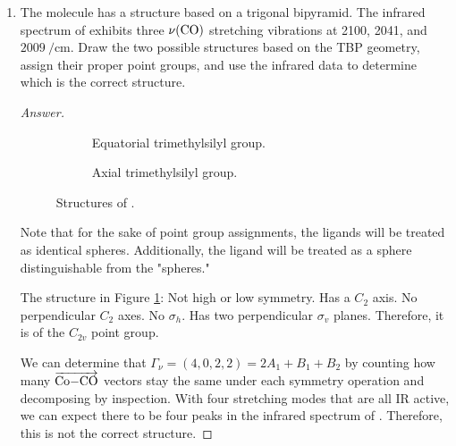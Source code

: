\documentclass[../psets.tex]{subfiles}
\begin{document}
\begin{enumerate}[label={\Roman*)}]
\begin{proof}[Answer]
\begin{align*}
        \end{align*}
    \end{proof}
    \newpage
    \item The molecule  has a structure based on a trigonal bipyramid. The infrared spectrum of  exhibits three $\nu(\ce{CO})$ stretching vibrations at 2100, 2041, and $\SI{2009}{\per\centi\meter}$. Draw the two possible structures based on the TBP geometry, assign their proper point groups, and use the infrared data to determine which is the correct structure.
    \begin{proof}[Answer]
        \begin{figure}[h!]
            \centering
            \begin{subfigure}[b]{0.35\linewidth}
                \centering
                \footnotesize
                \caption{Equatorial trimethylsilyl group.}
                \label{fig:structure-CoCO4SiMe3a}
            \end{subfigure}
            \begin{subfigure}[b]{0.35\linewidth}
                \centering
                \footnotesize
                \caption{Axial trimethylsilyl group.}
                \label{fig:structure-CoCO4SiMe3b}
            \end{subfigure}
            \caption{Structures of .}
            \label{fig:structure-CoCO4SiMe3}
        \end{figure}
        Note that for the sake of point group assignments, the  ligands will be treated as identical spheres. Additionally, the  ligand will be treated as a sphere distinguishable from the  "spheres."\par\medskip 
        The structure in Figure \ref{fig:structure-CoCO4SiMe3a}: Not high or low symmetry. Has a $C_2$ axis. No perpendicular $C_2$ axes. No $\sigma_h$. Has two perpendicular $\sigma_v$ planes. Therefore, it is of the $C_{2v}$ point group.\par
        We can determine that $\Gamma_\nu=(4,0,2,2)=2A_1+B_1+B_2$ by counting how many $\overrightarrow{\ce{Co-CO}}$ vectors stay the same under each symmetry operation and decomposing by inspection. With four stretching modes that are all IR active, we can expect there to be four peaks in the infrared spectrum of . Therefore, this is not the correct structure.\par\medskip

\end{proof}
\end{enumerate}
\end{document}
